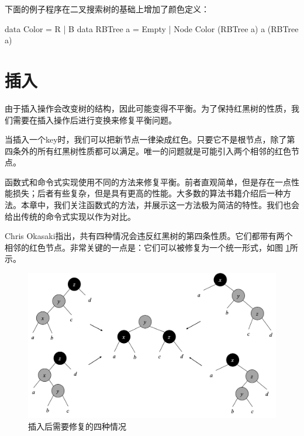 \documentclass[b5paper]{ctexart}
\begin{document}
下面的例子程序在二叉搜索树的基础上增加了颜色定义：

\begin{Haskell}
data Color = R | B
data RBTree a = Empty
              | Node Color (RBTree a) a (RBTree a)
\end{Haskell}

\begin{Exercise}
\end{Exercise}

\section{插入}

由于插入操作会改变树的结构，因此可能变得不平衡。为了保持红黑树的性质，我们需要在插入操作后进行变换来修复平衡问题。

当插入一个key时，我们可以把新节点一律染成红色。只要它不是根节点，除了第四条外的所有红黑树性质都可以满足。唯一的问题就是可能引入两个相邻的红色节点。

函数式和命令式实现使用不同的方法来修复平衡。前者直观简单，但是存在一点性能损失；后者有些复杂，但是具有更高的性能。大多数的算法书籍介绍后一种方法。本章中，我们关注函数式的方法，并展示这一方法极为简洁的特性。我们也会给出传统的命令式实现以作为对比。

Chris Okasaki指出，共有四种情况会违反红黑树的第四条性质。它们都带有两个相邻的红色节点。非常关键的一点是：它们可以被修复为一个统一形式\cite{okasaki}，如图 \ref{fig:insert-fix}所示。

\begin{figure}[htbp]
  \centering
  \includegraphics[scale=0.4]{img/insert-fix.png}
  \caption{插入后需要修复的四种情况}
  \label{fig:insert-fix}
\end{figure}
\end{document}
